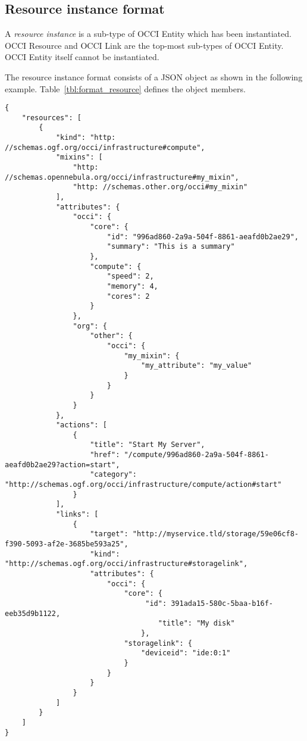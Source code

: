 \documentclass[10pt,a4paper]{article}
\begin{document}

\subsection{Resource instance format}
\label{sec:format_resource}

A {\em resource instance} is a sub-type of OCCI Entity which has been instantiated.
OCCI Resource and OCCI Link are the top-most sub-types of OCCI Entity.
OCCI Entity itself cannot be instantiated.

The resource instance format consists of a JSON object as shown in the
following example.
Table~\ref{tbl:format_resource} defines the object members.
\begin{verbatim}
{
    "resources": [
        {
            "kind": "http: //schemas.ogf.org/occi/infrastructure#compute",
            "mixins": [
                "http: //schemas.opennebula.org/occi/infrastructure#my_mixin",
                "http: //schemas.other.org/occi#my_mixin"
            ],
            "attributes": {
                "occi": {
                    "core": {
                        "id": "996ad860-2a9a-504f-8861-aeafd0b2ae29",
                        "summary": "This is a summary"
                    },
                    "compute": {
                        "speed": 2,
                        "memory": 4,
                        "cores": 2
                    }
                },
                "org": {
                    "other": {
                        "occi": {
                            "my_mixin": {
                                "my_attribute": "my_value"
                            }
                        }
                    }
                }
            },
            "actions": [
                {
                    "title": "Start My Server",
                    "href": "/compute/996ad860-2a9a-504f-8861-aeafd0b2ae29?action=start",
                    "category": "http://schemas.ogf.org/occi/infrastructure/compute/action#start"
                }
            ],
		    "links": [
		        {
		            "target": "http://myservice.tld/storage/59e06cf8-f390-5093-af2e-3685be593a25",
		            "kind": "http://schemas.ogf.org/occi/infrastructure#storagelink",
		            "attributes": {
		                "occi": {
		                    "core": {
		                         "id": 391ada15-580c-5baa-b16f-eeb35d9b1122,
		                    		"title": "My disk"
		                    	},
		                    "storagelink": {
		                        "deviceid": "ide:0:1"
		                    }
		                }
		            }
		        }
		    ]
        }
    ]
}
\end{verbatim}
\end{document}
